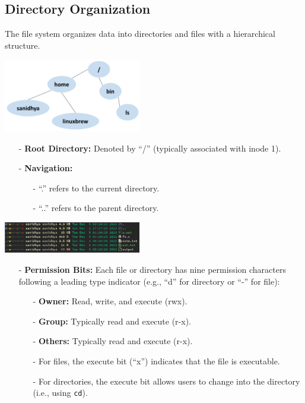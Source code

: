 \documentclass[../../compsys.tex]{subfiles}
\begin{document}
\subsection{Directory Organization}
The file system organizes data into directories and files with a hierarchical structure. 
\begin{center}
  \includegraphics[width=0.45\textwidth]{chapters/L6/images/file-tree.png}
\end{center}
\begin{itemize}
  \item[-] \textbf{Root Directory:} Denoted by ``/'' (typically associated with inode 1).
  \item[-] \textbf{Navigation:}
    \begin{itemize}
      \item[-] ``.'' refers to the current directory.
      \item[-] ``..'' refers to the parent directory.
    \end{itemize}
\end{itemize}
\begin{center}
  \includegraphics[width=0.45\textwidth]{chapters/L6/images/permissions.png}
\end{center}
\begin{itemize}
  \item[-] \textbf{Permission Bits:} Each file or directory has nine permission characters following a leading type indicator (e.g., ``d'' for directory or ``-'' for file):
    \begin{itemize}
      \item[-] \textbf{Owner:} Read, write, and execute (rwx).
      \item[-] \textbf{Group:} Typically read and execute (r-x).
      \item[-] \textbf{Others:} Typically read and execute (r-x).
    \end{itemize}
    \begin{itemize}
      \item[-] For files, the execute bit (``x'') indicates that the file is executable.
      \item[-] For directories, the execute bit allows users to change into the directory (i.e., using \texttt{cd}).
    \end{itemize}
\end{itemize}
\end{document}
